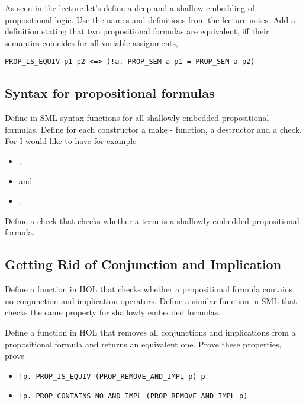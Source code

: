 \documentclass[a4paper,10pt,oneside]{scrartcl}
\begin{document}
As seen in the lecture let's define a deep and a shallow embedding of
propositional logic. Use the names and definitions from the lecture
notes. Add a definition stating that two propositional formulas are
equivalent, iff their semantics coincides for all variable
assignments, \ie

\begin{center}
\verb#PROP_IS_EQUIV p1 p2 <=> (!a. PROP_SEM a p1 = PROP_SEM a p2)#
\end{center}


\subsection{Syntax for propositional formulas}

Define in SML syntax functions for all shallowly embedded propositional formulas. 
Define for each constructor a make - function, a destructor and a check. 
For  I would like to have for example
\begin{itemize}
\item {}, 
\item {} and
\item {}.
\end{itemize}
Define a check  that checks whether
a term is a shallowly embedded propositional formula.

\subsection{Getting Rid of Conjunction and Implication}

Define a function in HOL  that checks whether a propositional
formula contains no conjunction and implication operators. Define a similar function  in SML that checks the same property for shallowly embedded formulas.

Define a function  in HOL that removes all conjunctions and implications
from a propositional formula and returns an equivalent one. Prove these properties, \ie prove

\begin{itemize}
\item \verb#!p. PROP_IS_EQUIV (PROP_REMOVE_AND_IMPL p) p#
\item \verb#!p. PROP_CONTAINS_NO_AND_IMPL (PROP_REMOVE_AND_IMPL p)#
\end{itemize}
\end{document}
